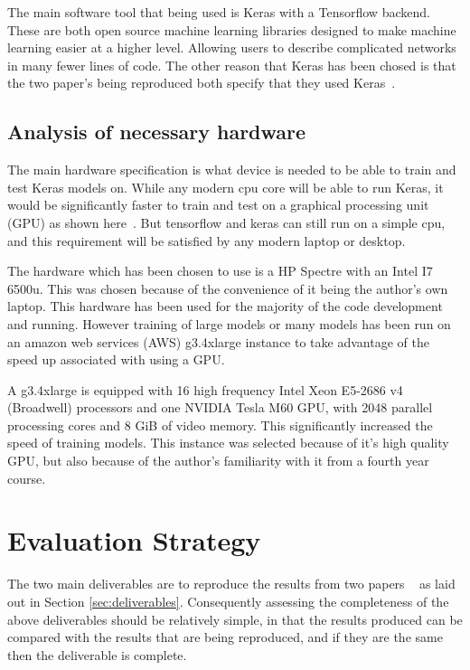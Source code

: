 \documentclass[12pt,onecolumn,letterpaper]{article}
\begin{document}
The main software tool that being used is Keras with a Tensorflow backend. These are both open source machine learning libraries designed to make machine learning easier at a higher level. Allowing users to describe complicated networks in many fewer lines of code. The other reason that Keras has been chosed is that the two paper's being reproduced both specify that they used Keras~\cite{oShea,Aoudia}. 

\subsection{Analysis of necessary hardware}
\label{sec:HardwareAnalysis}

The main hardware specification is what device is needed to be able to train and test Keras models on. While any modern cpu core will be able to run Keras, it would be significantly faster to train and test on a graphical processing unit (GPU) as shown here~\cite{TensorflowBenchmarking}. But tensorflow and keras can still run on a simple cpu, and this requirement will be satisfied by any modern laptop or desktop. 

The hardware which has been chosen to use is a HP Spectre with an Intel I7 6500u. This was chosen because of the convenience of it being the author's own laptop. This hardware has been used for the majority of the code development and running. However training of large models or many models has been run on an amazon web services (AWS) g3.4xlarge instance to take advantage of the speed up associated with using a GPU.

A g3.4xlarge is equipped with 16 high frequency Intel Xeon E5-2686 v4 (Broadwell) processors and one NVIDIA Tesla M60 GPU, with 2048 parallel processing cores and 8 GiB of video memory. This significantly increased the speed of training models. This instance was selected because of it's high quality GPU, but also because of the author's familiarity with it from a fourth year course.

\FloatBarrier
\section{Evaluation Strategy}

The two main deliverables are to reproduce the results from two papers ~\cite{oShea,Aoudia} as laid out in Section \ref{sec:deliverables}. Consequently assessing the completeness of the above deliverables should be relatively simple, in that the results produced can be compared with the results that are being reproduced, and if they are the same then the deliverable is complete.
\end{document}
